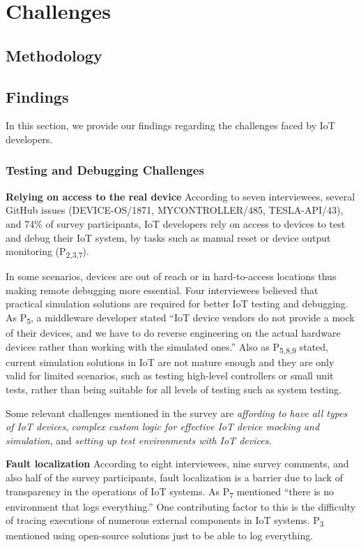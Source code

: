 
\chapter{Challenges}
\label{ch:Challenges}

\section{Methodology}


\section{Findings}
In this section, we provide our findings regarding the challenges faced by IoT developers.

\subsection{Testing and Debugging Challenges}
\textbf{Relying on access to the real device}
According to seven interviewees, several GitHub issues (DEVICE-OS/1871, MYCONTROLLER/485, TESLA-API/43), and 74\% of survey participants, IoT developers rely on access to devices to test and debug their IoT system, by tasks such as manual reset or device output monitoring (P\textsubscript{2,3,7}).


In some scenarios, devices are out of reach or in hard-to-access locations thus making remote debugging more essential. 
Four interviewees believed that practical simulation solutions are required for better IoT testing and debugging. As P\textsubscript{5}, a middleware developer stated \enquote{IoT device vendors do not provide a mock of their devices, and we have to do reverse engineering on the actual hardware devices rather than working with the simulated ones.} Also as P\textsubscript{5,8,9} stated, current simulation solutions in IoT are not mature enough and they are only valid for limited scenarios, such as testing high-level controllers or small unit tests, rather than being suitable for all levels of testing such as system testing.


Some relevant challenges mentioned in the survey are \emph{affording to have all types of IoT devices}, \emph{complex custom logic for effective IoT device mocking and simulation}, and \emph{setting up test environments with IoT devices}. 

\textbf{Fault localization}
According to eight interviewees, nine survey comments, and also half of the survey participants, fault localization is a barrier due to lack of transparency in the operations of IoT systems. As P\textsubscript{7} mentioned \enquote{there is no environment that logs everything.} One contributing factor to this is the difficulty of tracing executions of numerous external components in IoT systems. P\textsubscript{3} mentioned using open-source solutions just to be able to log everything. 


